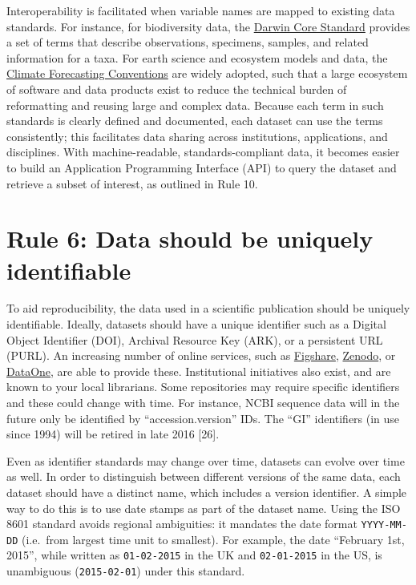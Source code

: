 \documentclass[10pt,letterpaper]{article}
\begin{document}
Interoperability is facilitated when variable names are mapped to
existing data standards. For instance, for biodiversity data, the
\href{http://www.tdwg.org/standards/450/}{Darwin Core Standard} provides
a set of terms that describe observations, specimens, samples, and
related information for a taxa. For earth science and ecosystem models
and data, the \href{https://cfconventions.org}{Climate Forecasting
Conventions} are widely adopted, such that a large ecosystem of software
and data products exist to reduce the technical burden of reformatting
and reusing large and complex data. Because each term in such standards
is clearly defined and documented, each dataset can use the terms
consistently; this facilitates data sharing across institutions,
applications, and disciplines. With machine-readable,
standards-compliant data, it becomes easier to build an Application
Programming Interface (API) to query the dataset and retrieve a subset
of interest, as outlined in Rule 10.

\section*{Rule 6: Data should be uniquely
identifiable}\label{rule-6-data-should-be-uniquely-identifiable}

To aid reproducibility, the data used in a scientific publication should
be uniquely identifiable. Ideally, datasets should have a unique
identifier such as a Digital Object Identifier (DOI), Archival Resource
Key (ARK), or a persistent URL (PURL). An increasing number of online
services, such as \href{http://figshare.com/}{Figshare},
\href{http://zenodo.org}{Zenodo}, or
\href{http://www.dataone.org}{DataOne}, are able to provide these.
Institutional initiatives also exist, and are known to your local
librarians. Some repositories may require specific identifiers and these
could change with time. For instance, NCBI sequence data will in the
future only be identified by ``accession.version'' IDs. The ``GI''
identifiers (in use since 1994) will be retired in late 2016 {[}26{]}.

Even as identifier standards may change over time, datasets can evolve
over time as well. In order to distinguish between different versions of
the same data, each dataset should have a distinct name, which includes
a version identifier. A simple way to do this is to use date stamps as
part of the dataset name. Using the ISO 8601 standard avoids regional
ambiguities: it mandates the date format \texttt{YYYY-MM-DD} (i.e.~from
largest time unit to smallest). For example, the date ``February 1st,
2015'', while written as \texttt{01-02-2015} in the UK and
\texttt{02-01-2015} in the US, is unambiguous (\texttt{2015-02-01})
under this standard.
\end{document}
